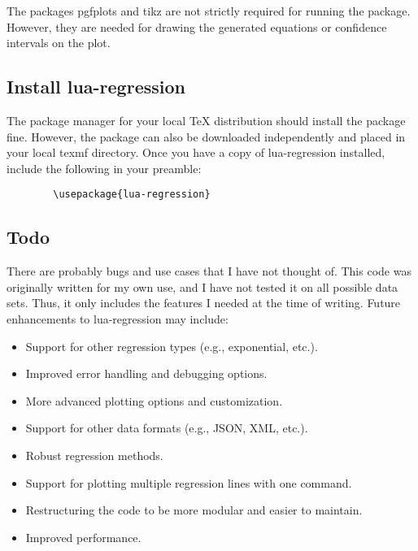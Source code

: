\documentclass[11pt]{article}
\begin{document}
    The packages {\ttfamily pgfplots} and {\ttfamily tikz} are not strictly required for running the package.
    However, they are needed for drawing the generated equations or confidence intervals on the plot.

    \subsection{Install {\ttfamily lua-regression}}

    The package manager for your local TeX distribution should install the package fine.
    However, the package can also be downloaded independently and placed in your local texmf directory.
    Once you have a copy of {\ttfamily lua-regression} installed, include the following in your preamble:

    \begin{verbatim}
        \usepackage{lua-regression}
    \end{verbatim}

    \subsection{Todo}

    There are probably bugs and use cases that I have not thought of.
    This code was originally written for my own use, and I have not tested it on all possible data sets.
    Thus, it only includes the features I needed at the time of writing.
    Future enhancements to {\ttfamily lua-regression} may include:

    \begin{itemize}
        \item Support for other regression types (e.g., exponential, etc.).
        \item Improved error handling and debugging options.
        \item More advanced plotting options and customization.
        \item Support for other data formats (e.g., JSON, XML, etc.).
        \item Robust regression methods.
        \item Support for plotting multiple regression lines with one command.
        \item Restructuring the code to be more modular and easier to maintain.
        \item Improved performance.
    \end{itemize}
\end{document}
